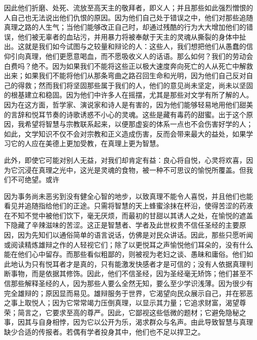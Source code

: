 因此他们折磨、处死、流放至高天主的敬拜者，即义人；并且那些如此强烈憎恨的人自己也无法说出他们仇恨的原因。因为他们自己处于错误之中，他们对那些追随真理之路的人生气；当他们能够改正自己时，却通过残酷的行为大大增加他们的错误，他们被无辜者的血玷污，并用暴力将被奉献于天主的灵魂从撕裂的身体中扯出。这就是我们如今试图与之较量和辩论的人：这些人，我们想把他们从愚蠢的信仰引向真理，他们更愿意喝血，而不愿吸收义人的话语。那么如何？我们的劳动会白费吗？绝不。因为如果我们不能将这些正以极大速度奔向死亡的人从死亡中解救出来；如果我们不能将他们从那条弯曲之路召回生命和光明，因为他们自己反对自己的得救；然而我们将坚固那些属于我们的人，他们的意见尚未坚定，尚未以坚固的根基建立和稳固。因为他们中许多人在摇摆，尤其是那些对文学有所了解的人。因为在这方面，哲学家、演说家和诗人是有害的，因为他们能够轻易地用他们甜美的言辞和悦耳节奏的诗歌诱惑不小心的灵魂。这些是藏有毒药的甜蜜。出于这个原因，我希望将智慧与宗教联系起来，以便那虚妄的体系一点也不会伤害好学的人；如此，文学知识不仅不会对宗教和正义造成伤害，反而会带来最大的益处，如果学习它的人应在美德上更加受教，在真理上更为智慧。\par

此外，即使它可能对别人无益，对我们却肯定有益：良心将自悦，心灵将欢喜，因为它沉浸在真理之光中，这光是灵魂的食物，被一种不可思议的愉悦所覆盖。但我们不可绝望。或许\par

\par

因为事务尚未恶劣到没有健全心智的地步，以致真理不能令人喜悦，并且他们也能看见并追随指给他们的正途。只需将智慧的天上蜂蜜涂抹在杯沿，使得苦涩的药液在不知不觉中被他们饮下，毫无厌烦，而最初的甘甜以其诱人之处，在愉悦的遮盖下隐藏了辛辣滋味的苦涩。这正是智慧者、学者及此世权贵不信任圣经的主要原因，因为先知们以通俗简单的语言说话，仿佛是对民众讲话。因此，那些只愿听闻或阅读精炼雄辩之作的人轻视它们；除了以更悦耳之声愉悦他们耳朵的，没有什么能在他们心中留存。而那些看似粗鄙的，则被视为老妇之谈、愚昧和庸俗。他们如此地认为只有悦耳者才是真的，只有能激发快感者才是可信的；没有人依据真理判断事物，而是依据其修饰。因此，他们不信圣经，因为圣经毫无矫饰；他们甚至不信那些解释圣经的人，因为那些人要么全然无知，要么至少学识浅薄。因为很少有完全雄辩的；原因显而易见。雄辩服务于世界，它渴望向民众展示自己，并在邪恶之事上取悦人；因为它常常竭力压倒真理，以显示其力量；它追求财富，渴望尊荣；简言之，它要求至高的尊严。因此，它鄙视这些低微的题材；它避免隐秘之事，因其与自身相悖，因为它以公开为乐，渴求群众与名声。由此导致智慧与真理缺少合适的传报者。若偶有学者投身其中，他们也不足以捍卫之。\par

